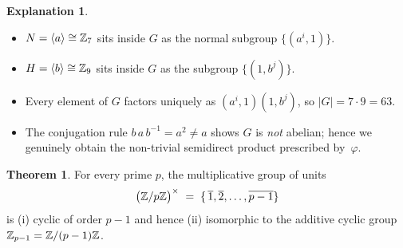 \documentclass[12pt]{article}
\theoremstyle{definition} %
\newtheorem{theorem}{Theorem}
\newtheorem{explanation}{Explanation}
\theoremstyle{plain} %
\begin{document}
\begin{explanation}
    \begin{itemize}
       \item $N=\langle a\rangle\cong\Bbb Z_{7}$
             sits inside $G$ as the normal subgroup
             $\{(a^{i},1)\}$.
       \item $H=\langle b\rangle\cong\Bbb Z_{9}$
             sits inside $G$ as the subgroup $\{(1,b^{j})\}$.
       \item Every element of $G$ factors uniquely as $(a^{i},1)(1,b^{j})$,
             so $|G|=7\cdot9=63$.
       \item The conjugation rule $b\,a\,b^{-1}=a^{2}\ne a$
             shows $G$ is \emph{not} abelian; hence we genuinely obtain the
             non-trivial semidirect product prescribed by~$\varphi$.
    \end{itemize}
    \end{explanation}
    \begin{theorem}
      For every prime $p$, the multiplicative group of units
      \[
         \bigl(\Bbb Z/p\Bbb Z\bigr)^{\times}
           \;=\;
         \{\,\overline{1},\overline{2},\ldots,\overline{p-1}\}
      \]
      is (i) cyclic of order $p-1$ and hence
      (ii) isomorphic to the additive cyclic group
      $\Bbb Z_{p-1}=\Bbb Z/(p-1)\Bbb Z$.
      \end{theorem}
      
\end{document}
